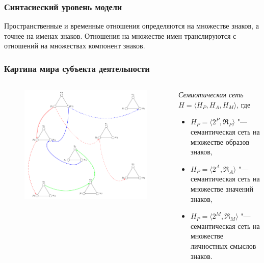\documentclass[default]{beamer}
\begin{document}
	\begin{frame}
		\frametitle{Синтасиеский уровень модели}
		
		Пространственные и временные отношения определяются на множестве знаков, а точнее на именах знаков. Отношения на множестве имен транслируются с отношений на множествах компонент знаков.
		
	\end{frame}

	\begin{frame}
		\frametitle{Картина мира субъекта деятельности}
		
		\begin{columns}
			\begin{column}{0.55\textwidth}
				\begin{figure}
					\includegraphics[width=\textwidth]{signs/signs_net}
				\end{figure}
			\end{column}
			\begin{column}{0.45\textwidth}
				\textit{Семиотическая сеть} $H=\langle H_P, H_A, H_M\rangle$, где
				\begin{itemize}
					\item $H_P=\langle2^P,\mathfrak R_P\rangle$ "--- семантическая сеть на множестве образов знаков,
					\item $H_P=\langle2^A,\mathfrak R_A\rangle$ "--- семантическая сеть на множестве значений знаков,
					\item $H_P=\langle2^M,\mathfrak R_M\rangle$ "--- семантическая сеть на множестве личностных смыслов знаков.
				\end{itemize}
			\end{column}
		\end{columns}
	\end{frame}		
	
\end{document}
